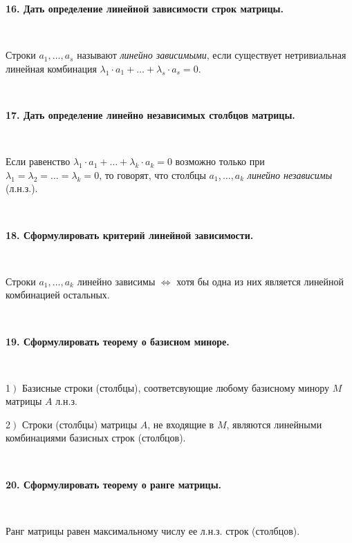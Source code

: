 \documentclass{article}
\begin{document}
    \textbf{16. Дать определение линейной зависимости строк матрицы.}

    {
        $\;$
        \setlength{\parindent}{0.4cm}
        \hangindent=0.4cm

    Строки $a_1, \ldots, a_s$ называют \textit{линейно зависимыми}, если существует нетривиальная линейная комбинация $\lambda_1\cdot a_1+\ldots+\lambda_s\cdot a_s=0$.

        $\;$
        \setlength{\parindent}{0cm}
        \hangindent=0cm
    }

    \textbf{17. Дать определение линейно независимых столбцов матрицы.}

    {
        $\;$
        \setlength{\parindent}{0.4cm}
        \hangindent=0.4cm

    Если равенство $\lambda_1\cdot a_1+\ldots+\lambda_k\cdot a_k=0$ возможно только при $\lambda_1=\lambda_2=\ldots=\lambda_k=0$, то говорят, что столбцы $a_1, \ldots, a_k$ \textit{линейно независимы} (л.н.з.).

        $\;$
        \setlength{\parindent}{0cm}
        \hangindent=0cm
    }

    \textbf{18. Сформулировать критерий линейной зависимости.}

    {
        $\;$
        \setlength{\parindent}{0.4cm}
        \hangindent=0.4cm

    Строки $a_1, \ldots, a_k$ линейно зависимы $\Leftrightarrow$ хотя бы одна из них является линейной комбинацией остальных.

        $\;$
        \setlength{\parindent}{0cm}
        \hangindent=0cm
    }

    \textbf{19. Сформулировать теорему о базисном миноре.}

    {
        $\;$
        \setlength{\parindent}{0.4cm}
        \hangindent=0.4cm

    1$\left.\right)$ Базисные строки (столбцы), соответсвующие любому базисному минору $M$ матрицы $A$ л.н.з.

    2$\left.\right)$ Строки (столбцы) матрицы $A$, не входящие в $M$, являются линейными комбинациями базисных строк (столбцов).

        $\;$
        \setlength{\parindent}{0cm}
        \hangindent=0cm
    }

    \textbf{20. Сформулировать теорему о ранге матрицы.}

    {
        $\;$
        \setlength{\parindent}{0.4cm}
        \hangindent=0.4cm

    Ранг матрицы равен максимальному числу ее л.н.з. строк (столбцов).

        $\;$
        \setlength{\parindent}{0cm}
        \hangindent=0cm
    }
\end{document}
